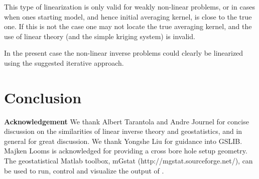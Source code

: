 \documentclass[12t]{article}
\begin{document}
This type of linearization is only valid for weakly non-linear problems, or in cases when ones starting model, and hence initial averaging kernel, is close to the true one. If this is not the case one may not locate the true averaging kernel, and the use of linear theory (and the simple kriging system) is invalid.

In the present case the non-linear inverse problems could clearly be linearized using the suggested iterative approach.
\vspace{1cm}

\section{Conclusion}
\label{sec:conclusion}

\textbf{Acknowledgement}
We thank Albert Tarantola and Andre Journel for concise discussion on the similarities of linear inverse theory and geostatistics, and in general for great discussion. We thank Yongshe Liu for guidance into GSLIB. Majken Looms is acknowledged for providing a cross bore hole setup geometry. The geostatistical Matlab toolbox, mGstat (http://mgstat.sourceforge.net/), can be used to run, control and visualize the output of \visimprog.


\nocite{Robertson:2006:DSSIM}
\nocite{Soares:2001:DSS}
\nocite{Oz:2003:DSSIM-HR}
\nocite{Journel:1978:MG}
\nocite{Journel:1999:VOL}
\nocite{Goovaerts:1997}
\nocite{Soares:2001:DSS}
\nocite{Oz:2003:DSSIM-HR}
\nocite{Deutsch:2000:DSSIM-HR}
\nocite{GSLIB}
\nocite{Hansen:2006:geostatinv}
\nocite{Liu:2006:FFTcov}

\nocite{SrinavasanJournel:1998}
\nocite{GomezHernandez:2000:CapeTown}
\nocite{GomezHernandez:2004:Banff}

\nocite{Gloaguen:2005}
\nocite{Gloaguen:2004:Banff}


                     
\end{document}

